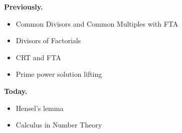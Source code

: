 \documentclass[t]{beamer}
\subtitle{Applications of the Fundamental Theorem of Arithmetic}
\begin{document}
	
\startdoc
\begin{frame}[c]{\insertframenumber}
	\begin{block}{\textbf{Previously.}}
	\begin{itemize}[label=--]
        \item Common Divisors and Common Multiples with FTA 
        \item Divisors of Factorials
        \item CRT and FTA 
        \item Prime power solution lifting
	\end{itemize}
	\end{block}
	\begin{block}{\textbf{Today.}}
		\begin{itemize}[label=--]
            \item Hensel's lemma
            \item Calculus in Number Theory
		\end{itemize}
	\end{block}
\end{frame}
\end{document}
